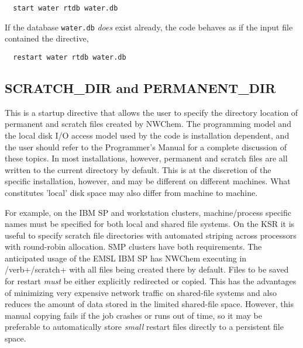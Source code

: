 \begin{verbatim}
  start water rtdb water.db
\end{verbatim}

If the database \verb+water.db+ {\it does} exist already,
the code behaves as if the input file contained the directive,

\begin{verbatim}
  restart water rtdb water.db
\end{verbatim}


\subsection{SCRATCH\_DIR and PERMANENT\_DIR}
\label{sec:dirs}


This is a startup directive that allows the user to specify the directory
location of permanent and scratch files created by NWChem.  The programming
model and the local disk I/O access model used by the code is installation
dependent, and the user should refer to the Programmer's Manual for a
complete discussion of these topics.  
In most installations, however, permanent and scratch files are all 
written to the current directory by default.  This is at the discretion
of the specific installation, however, and may be different on different
machines.  What constitutes 'local' disk space may also differ from
machine to machine.


For example, on the IBM SP and workstation clusters, machine/process 
specific names 
must be specified for both local and shared file systems.
On the KSR it is useful to specify scratch file directories with
automated striping across processors with round-robin allocation.  SMP
clusters have both requirements.  The anticipated usage of the EMSL
IBM SP has NWChem executing in /verb+/scratch+ with all files
being created there by default.  Files to be saved for restart 
{\em must} be either explicitly redirected or copied.  This has the
advantages of minimizing very expensive network traffic on shared-file
systems and also reduces the amount of data stored in the limited
shared-file space.  However, this manual copying fails if the job crashes or
runs out of time, so it may be preferable to automatically store
{\em small} restart files directly to a persistent file space.

